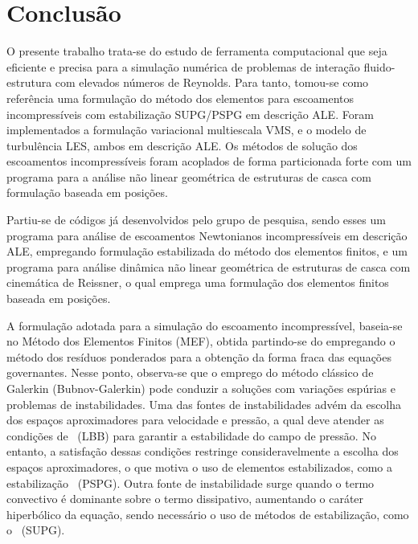 \chapter{Conclusão} \label{Conclusao}

O presente trabalho trata-se do estudo de ferramenta computacional que seja eficiente e precisa para a simulação numérica de problemas de interação fluido-estrutura com elevados números de Reynolds. Para tanto, tomou-se como referência uma formulação do método dos elementos para escoamentos incompressíveis com estabilização SUPG/PSPG em descrição ALE. Foram implementados a formulação variacional multiescala VMS, e o modelo de turbulência LES, ambos em descrição ALE. Os métodos de solução dos escoamentos incompressíveis foram acoplados de forma particionada forte com um programa para a análise não linear geométrica de estruturas de casca com formulação baseada em posições.

Partiu-se de códigos já desenvolvidos pelo grupo de pesquisa, sendo esses um programa para análise de escoamentos Newtonianos incompressíveis em descrição ALE, empregando formulação estabilizada do método dos elementos finitos, e um programa para análise dinâmica não linear geométrica de estruturas de casca com cinemática de Reissner, o qual emprega uma formulação dos elementos finitos baseada em posições.

A formulação adotada para a simulação do escoamento incompressível, baseia-se no Método dos Elementos Finitos (MEF), obtida partindo-se do empregando o método dos resíduos ponderados para a obtenção da forma fraca das equações governantes. Nesse ponto, observa-se que o emprego do método clássico de Galerkin (Bubnov-Galerkin) pode conduzir a soluções com variações espúrias e problemas de instabilidades. Uma das fontes de instabilidades advém da escolha dos espaços aproximadores para velocidade e pressão, a qual deve atender as condições de \LBB\ (LBB) para garantir a estabilidade do campo de pressão. No entanto, a satisfação dessas condições restringe consideravelmente a escolha dos espaços aproximadores, o que motiva o uso de elementos estabilizados, como a estabilização \PSPG\ (PSPG). Outra fonte de instabilidade surge quando o termo convectivo é dominante sobre o termo dissipativo, aumentando o caráter hiperbólico da equação, sendo necessário o uso de métodos de estabilização, como o \SUPG\ (SUPG).

